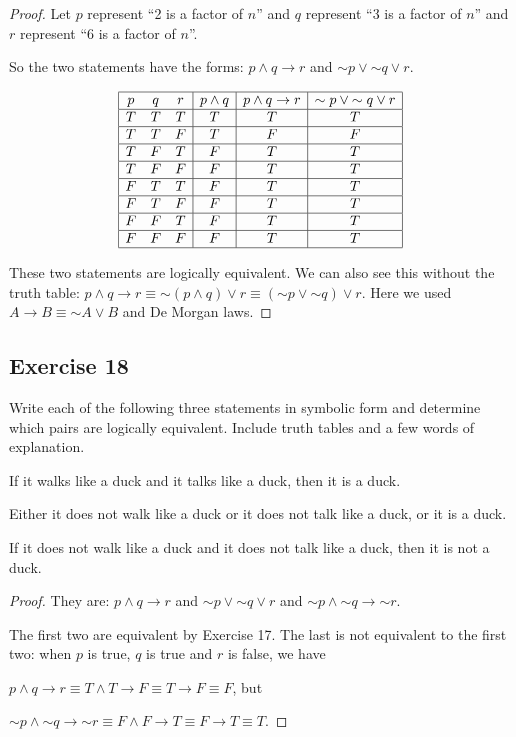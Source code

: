 \documentclass[14pt]{extarticle}
\begin{document}
\begin{proof} Let $p$ represent “2 is a factor of $n$” and $q$ represent “3 is a
factor of $n$” and $r$ represent ``6 is a factor of $n$''.

So the two statements have the forms: $p \wedge q \to r$ and ${\sim p} \vee
{\sim q} \vee r$.

$$ \begin{array}{|ccc|c|c|c|} \hline p & q & r & p \wedge q & p \wedge q \to r &
{\sim p} \vee {\sim q} \vee r \\ \hline T & T & T & T & T & T \\ \hline T & T &
F & T & F & F \\ \hline T & F & T & F & T & T \\ \hline T & F & F & F & T & T \\
\hline F & T & T & F & T & T \\ \hline F & T & F & F & T & T \\ \hline F & F & T
& F & T & T \\ \hline F & F & F & F & T & T \\ \hline \end{array} $$

These two statements are logically equivalent. We can also see this without the
truth table: $p \wedge q \to r \equiv {\sim (p \wedge q)} \vee r \equiv ({\sim
p} \vee {\sim q}) \vee r$. Here we used $A \to B \equiv {\sim A} \vee B$ and De
Morgan laws. \end{proof}

\subsection{Exercise 18} Write each of the following three statements in
symbolic form and determine which pairs are logically equivalent. Include truth
tables and a few words of explanation.

If it walks like a duck and it talks like a duck, then it is a duck.

Either it does not walk like a duck or it does not talk like a duck, or it is a
duck.

If it does not walk like a duck and it does not talk like a duck, then it is not
a duck.

\begin{proof} They are: $p \wedge q \to r$ and ${\sim p} \vee {\sim q} \vee r$
and ${\sim p} \wedge {\sim q} \to {\sim r}$.

The first two are equivalent by Exercise 17. The last is not equivalent to the
first two: when $p$ is true, $q$ is true and $r$ is false, we have

$p \wedge q \to r \equiv T \wedge T \to F \equiv T \to F \equiv F$, but 

${\sim p} \wedge {\sim q} \to {\sim r} \equiv F \wedge F \to T \equiv F \to T
\equiv T$. \end{proof}
\end{document}
